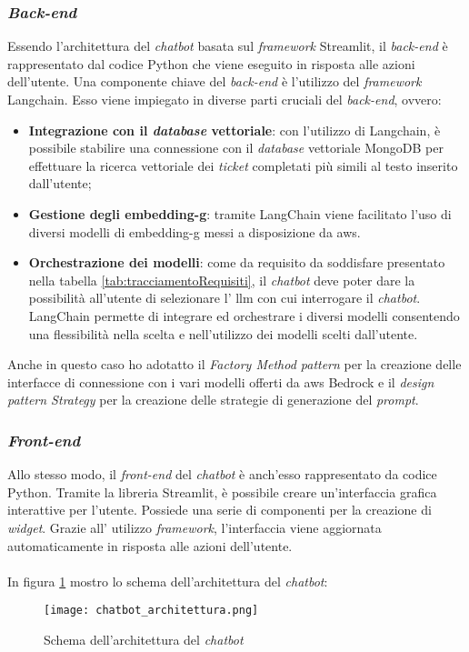 \subsubsection{\textit{Back-end}}
Essendo l'architettura del \textit{chatbot} basata sul \textit{framework} Streamlit, il \textit{back-end} è rappresentato dal codice Python che viene eseguito in risposta alle azioni dell'utente.
Una componente chiave del \textit{back-end} è l'utilizzo del \textit{framework} Langchain. Esso viene impiegato in diverse parti cruciali del \textit{back-end}, ovvero:
\begin{itemize}
    \item \textbf{Integrazione con il \textit{database} vettoriale}: con l'utilizzo di Langchain, è possibile stabilire una connessione con il \textit{database} vettoriale MongoDB per effettuare la ricerca vettoriale dei \textit{ticket} completati più simili al testo inserito dall'utente;
    \item \textbf{Gestione degli \gls{embedding-g}}: tramite LangChain viene facilitato l'uso di diversi modelli di \gls{embedding-g} messi a disposizione da \gls{aws}. 
    \item \textbf{Orchestrazione dei modelli}: come da requisito da soddisfare presentato nella tabella \ref{tab:tracciamentoRequisiti}, il \textit{chatbot} deve poter dare la possibilità all'utente di selezionare l' \gls{llm} con cui interrogare il \textit{chatbot}. LangChain permette di integrare ed orchestrare i diversi modelli consentendo una flessibilità nella scelta e nell'utilizzo dei modelli scelti dall'utente.
\end{itemize} 
\noindent
Anche in questo caso ho adotatto il \textit{Factory Method pattern} per la creazione delle interfacce di connessione con i vari modelli offerti da \gls{aws} Bedrock e il \textit{design pattern Strategy} per la creazione delle strategie di generazione del \textit{prompt}.
\subsubsection{\textit{Front-end}}
Allo stesso modo, il \textit{front-end} del \textit{chatbot} è anch'esso rappresentato da codice Python. Tramite la libreria Streamlit, è possibile creare un'interfaccia grafica interattive per l'utente. Possiede una serie di componenti per la creazione di \textit{widget}. Grazie all' utilizzo \textit{framework}, l'interfaccia viene aggiornata automaticamente in risposta alle azioni dell'utente. \\ \\
\noindent
In figura \ref{fig:architetturaChatbot} mostro lo schema dell'architettura del \textit{chatbot}:
\begin{figure}[H]
    \centering
    \texttt{[image: chatbot\_architettura.png]}
    \caption{Schema dell'architettura del \textit{chatbot}}
    \label{fig:architetturaChatbot}
\end{figure}

